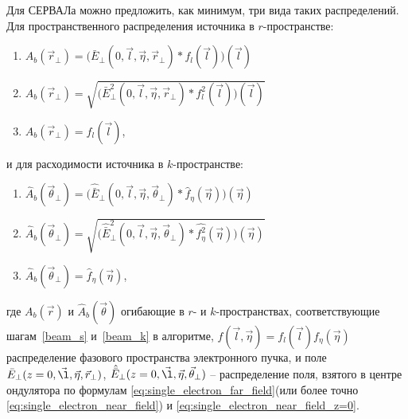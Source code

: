Для СЕРВАЛа можно предложить, как минимум, три вида таких распределений. Для пространственного распределения источника в $r$-пространстве:
\begin{enumerate}[label=\Roman*.]
	\item \label{amplitude} ${A}_{b} (\vec{r}_{\bot}) = \big(\bar{E}_{\bot}(0, \vec{l}, \vec{\eta}, \vec{r}_{\bot}) \ast f_l(\vec{l})\big)(\vec{l})$ \\

	\item \label{intensity} ${A}_{b} (\vec{r}_{\bot}) = \sqrt{\big(\bar{E}^2_{\bot}(0,  \vec{l}, \vec{\eta}, \vec{r}_{\bot}) \ast f_l^2(\vec{l})\big)(\vec{l})}$ \\

	\item \label{e-beam} ${A}_{b} (\vec{r}_{\bot}) = f_l(\vec{l})$,
\end{enumerate}
и для расходимости источника в $k$-пространстве:
\begin{enumerate}[label=\Roman*.]
	\item \label{amplitude} $\hat{{A}}_{b} (\vec{\theta}_{\bot}) = \big(\hat{\bar{E}}_{\bot}(0,  \vec{l}, \vec{\eta}, \vec{\theta}_{\bot}) \ast \hat{f}_{\eta}(\vec{\eta})\big)(\vec{\eta})$\\
	
	\item \label{intensity} $\hat{{A}}_{b} (\vec{\theta}_{\bot}) = \sqrt{\big(\hat{\bar{E}}^2_{\bot}(0,  \vec{l}, \vec{\eta}, \vec{\theta}_{\bot}) \ast \hat{f_{\eta}^2}(\vec{\eta})\big)(\vec{\eta})}$\\
	
	\item \label{e-beam} $\hat{{A}}_{b} (\vec{\theta}_{\bot}) = \hat{f}_{\eta}(\vec{\eta})$,
\end{enumerate}
где ${A}_{b} (\vec{r})$ и $\hat{{A}}_{b} (\vec{\theta})$ огибающие в $r$- и $k$-пространствах, соответствующие шагам~\ref{beam_s} и~\ref{beam_k} в алгоритме,  $f(\vec{l}, \vec{\eta}) = f_l(\vec{l}) f_{\eta}(\vec{\eta})$ распределение фазового пространства электронного пучка, и поле $\bar{E}_{\bot}(z=0, \vec{\l}, \vec{\eta}, \vec{r}_{\bot})$, $\hat{\bar{E}}_{\bot}(z=0 , \vec{\l}, \vec{\eta}, \vec{\theta}_{\bot})$ -- распределение поля, взятого в центре ондулятора по формулам \ref{eq:single_electron_far_field}(или более точно \ref{eq:single_electron_near_field}) и \ref{eq:single_electron_near_field_z=0}.

